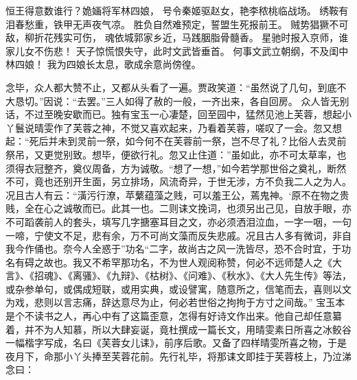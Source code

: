 \documentclass[12pt,oneside]{book}
\begin{document}
恒王得意数谁行？姽婳将军林四娘，
号令秦姬驱赵女，艳李秾桃临战场。
绣鞍有泪春愁重，铁甲无声夜气凉。
胜负自然难预定，誓盟生死报前王。
贼势猖獗不可敌，柳折花残实可伤，
魂依城郭家乡近，马践胭脂骨髓香。
星驰时报入京师，谁家儿女不伤悲！
天子惊慌恨失守，此时文武皆垂首。
何事文武立朝纲，不及闺中林四娘！
我为四娘长太息，歌成余意尚傍徨。

念毕，众人都大赞不止，又都从头看了一遍。贾政笑道：“虽然说了几句，到底不大恳切。”因说：“去罢。”三人如得了赦的一般，一齐出来，各自回房。
众人皆无别话，不过至晚安歇而已。独有宝玉一心凄楚，回至园中，猛然见池上芙蓉，想起小丫鬟说晴雯作了芙蓉之神，不觉又喜欢起来，乃看着芙蓉，嗟叹了一会。忽又想起：“死后并未到灵前一祭，如今何不在芙蓉前一祭，岂不尽了礼？比俗人去灵前祭吊，又更觉别致。想毕，便欲行礼。忽又止住道：”虽如此，亦不可太草率，也须得衣冠整齐，奠仪周备，方为诚敬。“想了一想，”如今若学那世俗之奠礼，断然不可，竟也还别开生面，另立排场，风流奇异，于世无涉，方不负我二人之为人。况且古人有云：“潢污行潦，苹蘩蕴藻之贱，可以羞王公，蔫鬼神。‘原不在物之贵贱，全在心之诚敬而已。此其一也。二则诔文挽词，也须另出己见，自放手眼，亦不可蹈袭前人的套头，填写几字搪塞耳目之文，亦必须洒泪泣血，一字一咽，一句一啼，宁使文不足，悲有余，万不可尚文藻而反失悲戚。况且古人多有微词，非自我今作俑也。奈今人全惑于”功名“二字，故尚古之风一洗皆尽，恐不合时宜，于功名有碍之故也。我又不希罕那功名，不为世人观阅称赞，何必不远师楚人之《大言》、《招魂》、《离骚》、《九辩》、《枯树》、《问难》、《秋水》、《大人先生传》等法，或杂参单句，或偶成短联，或用实典，或设譬寓，随意所之，信笔而去，喜则以文为戏，悲则以言志痛，辞达意尽为止，何必若世俗之拘拘于方寸之间哉。”
宝玉本是个不读书之人，再心中有了这篇歪意，怎得有好诗文作出来。他自己却任意纂着，并不为人知慕，所以大肆妄诞，竟杜撰成一篇长文，用晴雯素日所喜之冰鲛谷一幅楷字写成，名曰《芙蓉女儿诔》，前序后歌。又备了四样晴雯所喜之物，于是夜月下，命那小丫头捧至芙蓉花前。先行礼毕，将那诔文即挂于芙蓉枝上，乃泣涕念曰：
\end{document}
